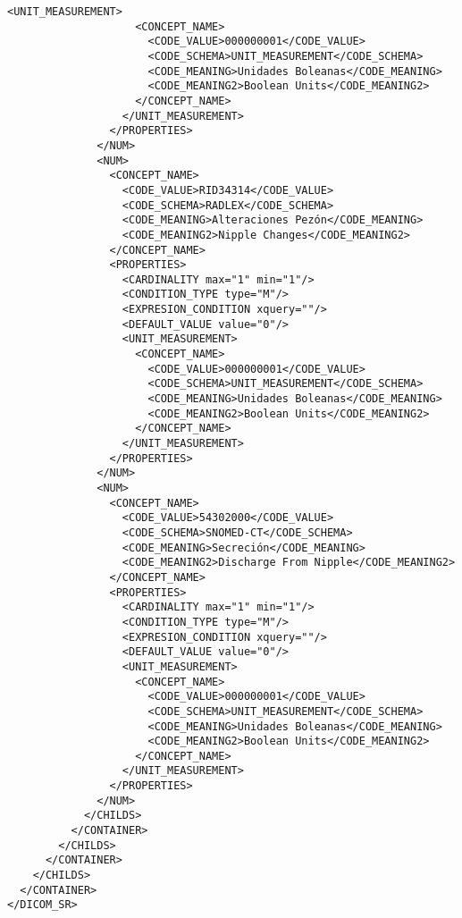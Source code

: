 \begin{lstlisting}[label=some-code,caption=Some Code]
                  <UNIT_MEASUREMENT>
                    <CONCEPT_NAME>
                      <CODE_VALUE>000000001</CODE_VALUE>
                      <CODE_SCHEMA>UNIT_MEASUREMENT</CODE_SCHEMA>
                      <CODE_MEANING>Unidades Boleanas</CODE_MEANING>
                      <CODE_MEANING2>Boolean Units</CODE_MEANING2>
                    </CONCEPT_NAME>
                  </UNIT_MEASUREMENT>
                </PROPERTIES>
              </NUM>
              <NUM>
                <CONCEPT_NAME>
                  <CODE_VALUE>RID34314</CODE_VALUE>
                  <CODE_SCHEMA>RADLEX</CODE_SCHEMA>
                  <CODE_MEANING>Alteraciones Pezón</CODE_MEANING>
                  <CODE_MEANING2>Nipple Changes</CODE_MEANING2>
                </CONCEPT_NAME>
                <PROPERTIES>
                  <CARDINALITY max="1" min="1"/>
                  <CONDITION_TYPE type="M"/>
                  <EXPRESION_CONDITION xquery=""/>
                  <DEFAULT_VALUE value="0"/>
                  <UNIT_MEASUREMENT>
                    <CONCEPT_NAME>
                      <CODE_VALUE>000000001</CODE_VALUE>
                      <CODE_SCHEMA>UNIT_MEASUREMENT</CODE_SCHEMA>
                      <CODE_MEANING>Unidades Boleanas</CODE_MEANING>
                      <CODE_MEANING2>Boolean Units</CODE_MEANING2>
                    </CONCEPT_NAME>
                  </UNIT_MEASUREMENT>
                </PROPERTIES>
              </NUM>
              <NUM>
                <CONCEPT_NAME>
                  <CODE_VALUE>54302000</CODE_VALUE>
                  <CODE_SCHEMA>SNOMED-CT</CODE_SCHEMA>
                  <CODE_MEANING>Secreción</CODE_MEANING>
                  <CODE_MEANING2>Discharge From Nipple</CODE_MEANING2>
                </CONCEPT_NAME>
                <PROPERTIES>
                  <CARDINALITY max="1" min="1"/>
                  <CONDITION_TYPE type="M"/>
                  <EXPRESION_CONDITION xquery=""/>
                  <DEFAULT_VALUE value="0"/>
                  <UNIT_MEASUREMENT>
                    <CONCEPT_NAME>
                      <CODE_VALUE>000000001</CODE_VALUE>
                      <CODE_SCHEMA>UNIT_MEASUREMENT</CODE_SCHEMA>
                      <CODE_MEANING>Unidades Boleanas</CODE_MEANING>
                      <CODE_MEANING2>Boolean Units</CODE_MEANING2>
                    </CONCEPT_NAME>
                  </UNIT_MEASUREMENT>
                </PROPERTIES>
              </NUM>
            </CHILDS>
          </CONTAINER>
        </CHILDS>
      </CONTAINER>
    </CHILDS>
  </CONTAINER>
</DICOM_SR>
\end{lstlisting}
